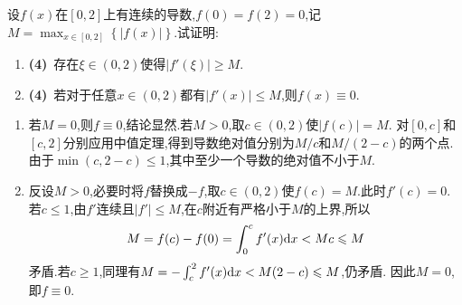 \documentclass{ctexart}
\begin{document}
\begin{problem}[6.(8\songti{分})]
设$f(x)$在$[0,2]$上有连续的导数,$f(0)=f(2)=0$,记$M=\displaystyle\max_{x\in[0,2]}\left\{|f(x)|\right\}$.试证明:
        \begin{enumerate}[label=\tbf{(\arabic*)}]
            \item \textbf{(4)}\ 存在$\xi\in(0,2)$使得$\left|f'(\xi)\right|\geqslant M$.
            \item \textbf{(4)}\ 若对于任意$x\in(0,2)$都有$\left|f'(x)\right|\leqslant M$,则$f(x)\equiv0$.
        \end{enumerate}
\end{problem}
\begin{solution}
\begin{enumerate}[label=\tbf{(\arabic*)},leftmargin=*]
\item 若$M=0$,则$f\equiv0$,结论显然.若$M>0$,取$c\in(0,2)$使$|f(c)|=M$.
对$[0,c]$和$[c,2]$分别应用中值定理,得到导数绝对值分别为$M/c$和$M/(2-c)$的两个点.
由于$\min(c,2-c)\leqslant1$,其中至少一个导数的绝对值不小于$M$.
\item 反设$M>0$,必要时将$f$替换成$-f$,取$c\in(0,2)$使$f(c)=M$.此时$f'(c)=0$.
若$c\leqslant1$,由$f'$连续且$|f'|\leqslant M$,在$c$附近有严格小于$M$的上界,所以
\[M=f(c)-f(0)=\int_0^c f'(x)\mathrm{d} x<Mc\leqslant M\]
矛盾.若$c\geqslant1$,同理有$M=-\int_c^2 f'(x)\mathrm{d} x<M(2-c)\leqslant M$,仍矛盾.
因此$M=0$,即$f\equiv0$.
\end{enumerate}
\end{solution}
\end{document}
